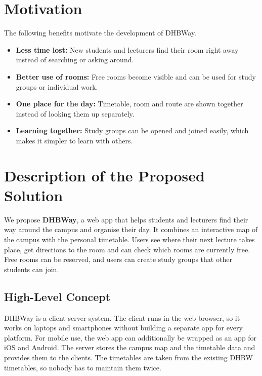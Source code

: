 \documentclass[11pt, a4paper]{article}
\begin{document}
\section{Motivation}
The following benefits motivate the development of DHBWay.

\begin{itemize}
    \item \textbf{Less time lost:} New students and lecturers find their room right away instead of searching or asking around.
    \item \textbf{Better use of rooms:} Free rooms become visible and can be used for study groups or individual work.
    \item \textbf{One place for the day:} Timetable, room and route are shown together instead of looking them up separately.
    \item \textbf{Learning together:} Study groups can be opened and joined easily, which makes it simpler to learn with others.
\end{itemize}

\section{Description of the Proposed Solution}
We propose \textbf{DHBWay}, a web app that helps students and lecturers find their way around the campus and organise their day. It combines an interactive map of the campus with the personal timetable. Users see where their next lecture takes place, get directions to the room and can check which rooms are currently free. Free rooms can be reserved, and users can create study groups that other students can join.

\subsection*{High-Level Concept}
DHBWay is a client-server system. The client runs in the web browser, so it works on laptops and smartphones without building a separate app for every platform. For mobile use, the web app can additionally be wrapped as an app for iOS and Android. The server stores the campus map and the timetable data and provides them to the clients. The timetables are taken from the existing DHBW timetables, so nobody has to maintain them twice.
\end{document}

